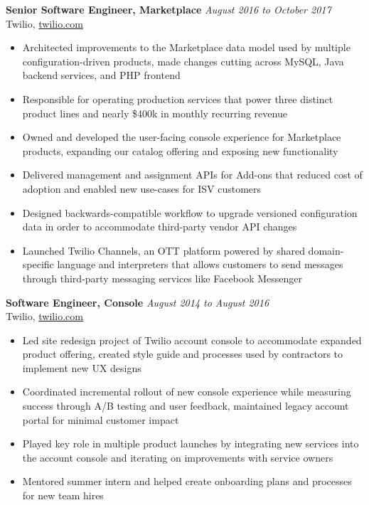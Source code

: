 \documentclass[margin,line]{resume}
\begin{document}
\begin{resume}
\textbf{Senior Software Engineer, Marketplace} \hfill \textsl{August 2016 to October 2017}\vspace{0mm}\\%
Twilio, \href{http://twilio.com}{twilio.com}\vspace{0mm}\\\vspace{-2mm}%
\begin{itemize}
\item Architected improvements to the Marketplace data model used by multiple configuration-driven products, made changes cutting across MySQL, Java backend services, and PHP frontend
\item Responsible for operating production services that power three distinct product lines and nearly \$400k in monthly recurring revenue
\item Owned and developed the user-facing console experience for Marketplace products, expanding our catalog offering and exposing new functionality
\item Delivered management and assignment APIs for Add-ons that reduced cost of adoption and enabled new use-cases for ISV customers
\item Designed backwards-compatible workflow to upgrade versioned configuration data in order to accommodate third-party vendor API changes
\item Launched Twilio Channels, an OTT platform powered by shared domain-specific language and interpreters that allows customers to send messages through third-party messaging services like Facebook Messenger
\end{itemize}

\textbf{Software Engineer, Console} \hfill \textsl{August 2014 to August 2016}\vspace{0mm}\\%
Twilio, \href{https://twilio.com}{twilio.com}\vspace{0mm}\\\vspace{-2mm}%
\begin{itemize}
\item Led site redesign project of Twilio account console to accommodate expanded product offering, created style guide and processes used by contractors to implement new UX designs
\item Coordinated incremental rollout of new console experience while measuring success through A/B testing and user feedback, maintained legacy account portal for minimal customer impact
\item Played key role in multiple product launches by integrating new services into the account console and iterating on improvements with service owners
\item Mentored summer intern and helped create onboarding plans and processes for new team hires
\end{itemize}


\end{resume}
\end{document}
